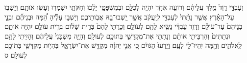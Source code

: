 \documentclass{openreader}
\begin{document}
וְעַבְדִּ֤י דָוִד֙ מֶ֣לֶךְ עֲלֵיהֶ֔ם וְרֹועֶ֥ה אֶחָ֖ד יִהְיֶ֣ה לְכֻלָּ֑ם וּבְמִשְׁפָּטַ֣י יֵלֵ֔כוּ וְחֻקֹּתַ֥י יִשְׁמְר֖וּ וְעָשׂ֥וּ אֹותָֽם׃ 
וְיָשְׁב֣וּ עַל־הָאָ֗רֶץ אֲשֶׁ֤ר נָתַ֨תִּי֙ לְעַבְדִּ֣י לְיַֽעֲקֹ֔ב אֲשֶׁ֥ר יָֽשְׁבוּ־בָ֖הּ אֲבֹֽותֵיכֶ֑ם וְיָשְׁב֣וּ עָלֶ֡יהָ הֵ֠מָּה וּבְנֵיהֶ֞ם וּבְנֵ֤י בְנֵיהֶם֙ עַד־עֹולָ֔ם וְדָוִ֣ד עַבְדִּ֔י נָשִׂ֥יא לָהֶ֖ם לְעֹולָֽם׃ 
וְכָרַתִּ֤י לָהֶם֙ בְּרִ֣ית שָׁלֹ֔ום בְּרִ֥ית עֹולָ֖ם יִהְיֶ֣ה אֹותָ֑ם וּנְתַתִּים֙ וְהִרְבֵּיתִ֣י אֹותָ֔ם וְנָתַתִּ֧י אֶת־מִקְדָּשִׁ֛י בְּתֹוכָ֖ם לְעֹולָֽם׃ 
וְהָיָ֤ה מִשְׁכָּנִי֙ עֲלֵיהֶ֔ם וְהָיִ֥יתִי לָהֶ֖ם לֵֽאלֹהִ֑ים וְהֵ֖מָּה יִֽהְיוּ־לִ֥י לְעָֽם׃ 
וְיָֽדְעוּ֙ הַגֹּויִ֔ם כִּ֚י אֲנִ֣י יְהוָ֔ה מְקַדֵּ֖שׁ אֶת־יִשְׂרָאֵ֑ל בִּהְיֹ֧ות מִקְדָּשִׁ֛י בְּתֹוכָ֖ם לְעֹולָֽם׃ ס 
\end{document}
